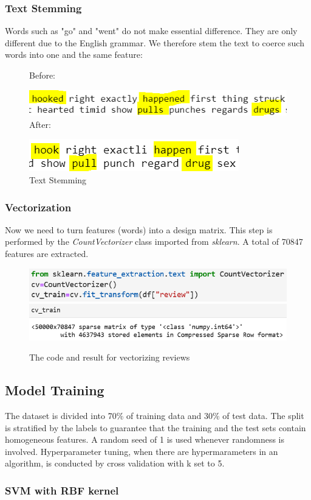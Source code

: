 \documentclass[10pt,twocolumn,letterpage]{article}
\begin{document}
		\subsubsection{Text Stemming}
			Words such as "go" and "went" do not make essential difference. They are only different due to the English grammar. We therefore stem the text to coerce such words into one and the same feature:
			\begin{figure}[H]
				\textsf{Before:}
			
				\includegraphics[width = \columnwidth]{stem}
				\textsf{After:}
			
				\includegraphics[width = \columnwidth]{after_stem}
				\caption{Text Stemming}
			\end{figure}

		\subsubsection{Vectorization}
			Now we need to turn features (words) into a design matrix. This step is performed by the \textit{CountVectorizer} class imported from \textit{sklearn}. A total of 70847 features are extracted.
			\begin{figure}[H]
				\includegraphics[width = \columnwidth]{vectorization}
				\includegraphics[width = \columnwidth]{vec_result}
				\caption{The code and result for vectorizing reviews}
			\end{figure}
	
		\subsection{Model Training}
			The dataset is divided into 70\% of training data and 30\% of test data. The split is stratified by the labels to guarantee that the training and the test sets contain homogeneous features. A random seed of 1 is used whenever randomness is involved. Hyperparameter tuning, when there are hypermarameters in an algorithm, is conducted by cross validation with k set to 5. 
		\subsubsection{SVM with RBF kernel}
\end{document}
